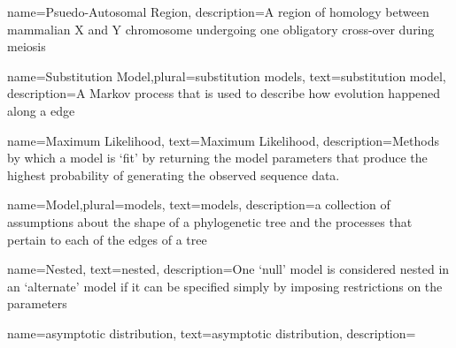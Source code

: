 {
        name=Psuedo-Autosomal Region,
        description={A region of homology between mammalian X and Y chromosome undergoing one obligatory cross-over during meiosis}
}

{
        name={Substitution Model},plural={substitution models},
        text=substitution model,
        description={A Markov process that is used to describe how evolution happened along a edge}
}

{
        name=Maximum Likelihood,
        text=Maximum Likelihood,
        description={Methods by which a model is ‘fit’ by returning the model parameters that produce the highest probability of generating the observed sequence data.}
}

{
        name={Model},plural={models},
        text={models},
        description={a collection of assumptions about the shape of a phylogenetic tree and the processes that pertain to each of the edges of a tree}
}

{
        name=Nested,
        text=nested,
        description={One `null’ model is considered nested in an `alternate’ model if it can be specified simply by imposing restrictions on the parameters}
}




{
        name=asymptotic distribution,
        text=asymptotic distribution,
        description={ }
}









